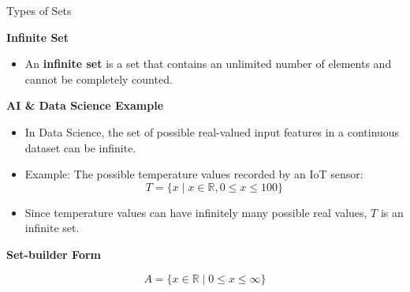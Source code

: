 \documentclass{beamer}
\begin{document}
\begin{frame}{Types of Sets}

\textbf{Infinite Set}

\begin{itemize}
    \item An \textbf{infinite set} is a set that contains an unlimited number of elements and cannot be completely counted.
\end{itemize}

\vspace{0.3cm}

\textbf{AI \& Data Science Example}

\begin{itemize}
    \item In Data Science, the set of possible real-valued input features in a continuous dataset can be infinite.
    \item Example: The possible temperature values recorded by an IoT sensor:
    \[
    T=\{x \mid x \in \mathbb{R}, 0 \leq x \leq 100\}
    \]
    \item Since temperature values can have infinitely many possible real values, \(T\) is an infinite set.
\end{itemize}

\vspace{0.3cm}

\textbf{Set-builder Form}

\[
A=\{x \in \mathbb{R} \mid 0 \leq x \leq \infty\}
\]

\end{frame}
\end{document}
